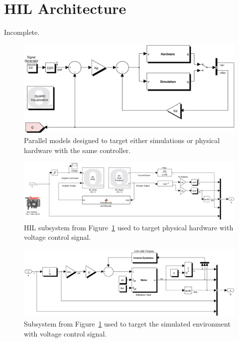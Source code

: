 
\section{HIL Architecture} %
\label{sec:hil_architecture}
Incomplete. 

\begin{figure}[!h]
	\centering
    \includegraphics[scale=0.6]{fig/experiments/parallelmodels.eps} 
  	\caption{Parallel models designed to target either simulations or physical hardware with the same controller.}
	\label{fig:parallelmodels}
\end{figure}

\begin{figure}[!h]
	\centering
    \includegraphics[scale=0.45]{fig/experiments/hilmodel.eps} 
  	\caption{HIL subsystem from Figure~\ref{fig:parallelmodels} used to target physical hardware with voltage control signal.}
	\label{fig:hilmodel}
\end{figure}

\begin{figure}[!h]
	\centering
    \includegraphics[scale=0.55]{fig/experiments/simmodel.eps} 
  	\caption{Subsystem from Figure~\ref{fig:parallelmodels} used to target the simulated environment with voltage control signal.}
	\label{fig:simmodel}
\end{figure}

